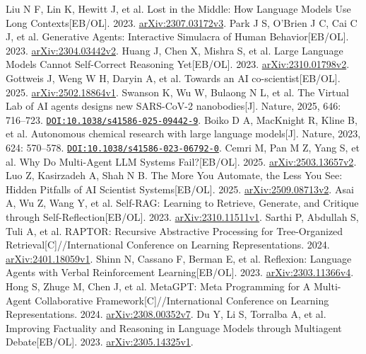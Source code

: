  Liu N F, Lin K, Hewitt J, et al. Lost in the Middle: How Language Models Use Long Contexts[EB/OL]. 2023. \href{https://arxiv.org/abs/2307.03172v3}{arXiv:2307.03172v3}.
 Park J S, O'Brien J C, Cai C J, et al. Generative Agents: Interactive Simulacra of Human Behavior[EB/OL]. 2023. \href{https://arxiv.org/abs/2304.03442v2}{arXiv:2304.03442v2}.
 Huang J, Chen X, Mishra S, et al. Large Language Models Cannot Self-Correct Reasoning Yet[EB/OL]. 2023. \href{https://arxiv.org/abs/2310.01798v2}{arXiv:2310.01798v2}.
 Gottweis J, Weng W H, Daryin A, et al. Towards an AI co-scientist[EB/OL]. 2025. \href{https://arxiv.org/abs/2502.18864v1}{arXiv:2502.18864v1}.
 Swanson K, Wu W, Bulaong N L, et al. The Virtual Lab of AI agents designs new SARS-CoV-2 nanobodies[J]. Nature, 2025, 646: 716--723. \href{https://doi.org/10.1038/s41586-025-09442-9}{\nolinkurl{DOI:10.1038/s41586-025-09442-9}}.
 Boiko D A, MacKnight R, Kline B, et al. Autonomous chemical research with large language models[J]. Nature, 2023, 624: 570--578. \href{https://doi.org/10.1038/s41586-023-06792-0}{\nolinkurl{DOI:10.1038/s41586-023-06792-0}}.
 Cemri M, Pan M Z, Yang S, et al. Why Do Multi-Agent LLM Systems Fail?[EB/OL]. 2025. \href{https://arxiv.org/abs/2503.13657v2}{arXiv:2503.13657v2}.
 Luo Z, Kasirzadeh A, Shah N B. The More You Automate, the Less You See: Hidden Pitfalls of AI Scientist Systems[EB/OL]. 2025. \href{https://arxiv.org/abs/2509.08713v2}{arXiv:2509.08713v2}.
 Asai A, Wu Z, Wang Y, et al. Self-RAG: Learning to Retrieve, Generate, and Critique through Self-Reflection[EB/OL]. 2023. \href{https://arxiv.org/abs/2310.11511v1}{arXiv:2310.11511v1}.
 Sarthi P, Abdullah S, Tuli A, et al. RAPTOR: Recursive Abstractive Processing for Tree-Organized Retrieval[C]//International Conference on Learning Representations. 2024. \href{https://arxiv.org/abs/2401.18059v1}{arXiv:2401.18059v1}.
 Shinn N, Cassano F, Berman E, et al. Reflexion: Language Agents with Verbal Reinforcement Learning[EB/OL]. 2023. \href{https://arxiv.org/abs/2303.11366v4}{arXiv:2303.11366v4}.
 Hong S, Zhuge M, Chen J, et al. MetaGPT: Meta Programming for A Multi-Agent Collaborative Framework[C]//International Conference on Learning Representations. 2024. \href{https://arxiv.org/abs/2308.00352v7}{arXiv:2308.00352v7}.
 Du Y, Li S, Torralba A, et al. Improving Factuality and Reasoning in Language Models through Multiagent Debate[EB/OL]. 2023. \href{https://arxiv.org/abs/2305.14325v1}{arXiv:2305.14325v1}.
